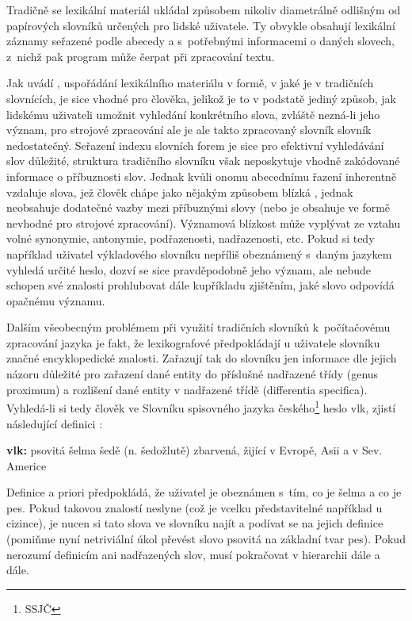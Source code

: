 \documentclass[a4paper, 11pt, oneside, showtrims]{book}
\newcommand\ex{\textsf}
\begin{document}
				Tradičně se lexikální materiál ukládal způsobem nikoliv diametrálně odlišným od papírových slovníků určených pro lidské uživatele. Ty obvykle obsahují lexikální záznamy seřazené podle abecedy a s~potřebnými informacemi o daných slovech, z~nichž pak program může čerpat při zpracování textu.

				Jak uvádí \textcite{pala2013vceska}, uspořádání lexikálního materiálu v formě, v jaké je v tradičních slovnících, je sice vhodné pro člověka, jelikož je to v podstatě jediný způsob, jak lidskému uživateli umožnit vyhledání konkrétního slova, zvláště nezná-li jeho význam, pro strojové zpracování ale je ale takto zpracovaný slovník slovník nedostatečný. Seřazení indexu slovních forem je sice pro efektivní vyhledávání slov důležité, struktura tradičního slovníku však neposkytuje vhodně zakódované informace o příbuznosti slov. Jednak kvůli onomu abecednímu řazení inherentně vzdaluje slova, jež člověk chápe jako nějakým způsobem blízká \parencite{pala2013vceska}, jednak neobsahuje dodatečné vazby mezi příbuznými slovy (nebo je obsahuje ve formě nevhodné pro strojové zpracování). Významová blízkost může vyplývat ze vztahu volné synonymie, antonymie, podřazenosti, nadřazenosti, etc. Pokud si tedy například uživatel výkladového slovníku nepříliš obeznámený s~daným jazykem vyhledá určité heslo, dozví se sice pravděpodobně jeho význam, ale nebude schopen své znalosti prohlubovat dále kupříkladu zjištěním, jaké slovo odpovídá opačnému významu.

				Dalším všeobecným problémem při využití tradičních slovníků k~počítačovému zpracování jazyka je fakt, že lexikografové předpokládají u uživatele slovníku značné encyklopedické znalosti. Zařazují tak do slovníku jen informace dle jejich názoru důležité pro zařazení dané entity do příslušné nadřazené třídy (genus proximum) a rozlišení dané entity v nadřazené třídě (differentia specifica). Vyhledá-li si tedy člověk ve Slovníku spisovného jazyka českého\footnote{SSJČ} heslo \ex{vlk}, zjistí následující definici \parencite{Havranek1989}:

				\bigskip
				\ex{\textbf{vlk: } psovitá šelma šedě (n. šedožlutě) zbarvená, žijící v Evropě, Asii a v Sev. Americe}
				\bigskip

				Definice a priori předpokládá, že uživatel je obeznámen s~tím, co je \ex{šelma} a co je \ex{pes}. Pokud takovou znalostí neslyne (což je vcelku představitelné například u cizince), je nucen si tato slova ve slovníku najít a podívat se na jejich definice (pomiňme nyní netriviální úkol převést slovo \ex{psovitá} na základní tvar \ex{pes}). Pokud nerozumí definicím ani nadřazených slov, musí pokračovat v hierarchii dále a dále. 
\end{document}
